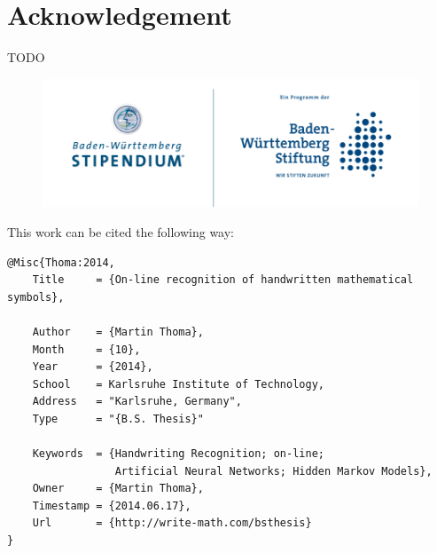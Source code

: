 \chapter*{Acknowledgement}

TODO

\begin{figure}[h]
    \centering
\end{figure}

\begin{figure}[h]
    \centering
    \includegraphics*[width=\linewidth, keepaspectratio]{logos/bw-stipendium.png} 
\end{figure}

\clearpage

This work can be cited the following way:

\begin{verbatim}
@Misc{Thoma:2014,
    Title     = {On-line recognition of handwritten mathematical symbols},

    Author    = {Martin Thoma},
    Month     = {10},
    Year      = {2014},
    School    = Karlsruhe Institute of Technology,
    Address   = "Karlsruhe, Germany",
    Type      = "{B.S. Thesis}"

    Keywords  = {Handwriting Recognition; on-line;
                 Artificial Neural Networks; Hidden Markov Models},
    Owner     = {Martin Thoma},
    Timestamp = {2014.06.17},
    Url       = {http://write-math.com/bsthesis}
}
\end{verbatim}